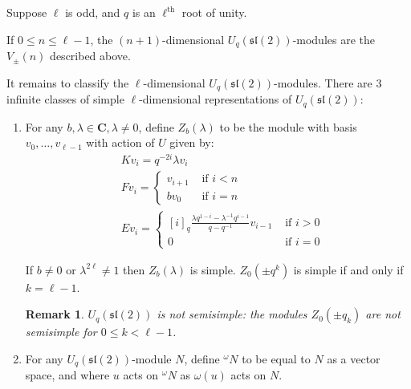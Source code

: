 \documentclass[]{article}
\newtheorem{remark}[theorem]{Remark}
\newcommand{\sll}{\mathfrak{sl}}
\numberwithin{equation}{subsection}
\begin{document}

Suppose $\ell$ is odd, and $q$ is an $\ell^{\text{th}}$ root of unity. 

If $0 \leq n \leq \ell - 1$, the $(n+1)$-dimensional
$U_q(\sll(2))$-modules are the $V_{\pm}(n)$ described above. 

It remains to classify the $\ell$-dimensional $U_q(\sll(2))$-modules.
There are $3$ infinite classes of simple $\ell$-dimensional representations of  $U_q(\sll(2))$:
\begin{enumerate}
        \item For any $b,\lambda \in \mathbf{C}, \lambda \neq 0$, define
            $Z_b(\lambda)$ to be the module with basis $v_0, \ldots, v_{\ell -
            1}$ with action of $U$ given by: 
\begin{align*}
    &K v_i = q^{-2i} \lambda v_i \\
    &F v_i = \begin{cases} v_{i+1}& \text{ if $i < n$} \\  b v_0& \text{ if $i = n$} \end{cases}  \\
    &E v_i = \begin{cases} 
        [i]_q \frac{\lambda q^{1-i} - \lambda^{-1} q^{i-1}}{q - q^{-1}} v_{i-1}& \text{ if $i > 0$} \\ 
                    0& \text{ if $i = 0$} 
             \end{cases} 
\end{align*}

If $b \neq 0$ or $\lambda^{2\ell}\neq 1$ then $Z_b(\lambda)$ is simple.
$Z_0(\pm q^k)$ is simple if and only if $k = \ell - 1$. 

\begin{remark}
    $U_q(\sll(2))$ is not semisimple: the modules $Z_0(\pm q_k)$ are not semisimple for $0 \leq k < \ell - 1$.
\end{remark}
\item For any $U_q(\sll(2))$-module $N$, define $^\omega N$ to be
    equal to $N$ as a vector space, and where $u$ acts on $^\omega N$ as
    $\omega(u)$ acts on $N$.


\end{enumerate}
\end{document}
